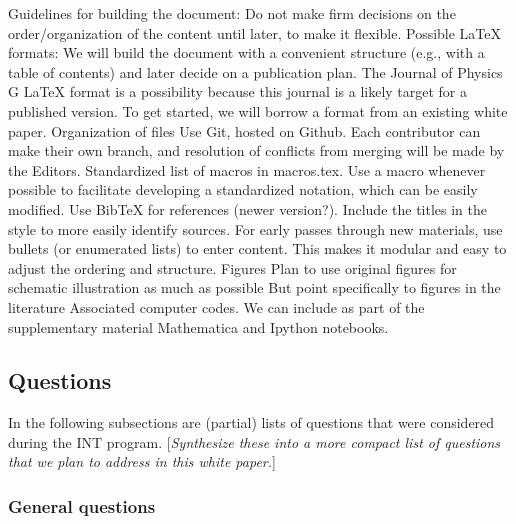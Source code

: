 Guidelines for building the document:
\bi
  \I Do not make firm decisions on the order/organization of the content until later,
      to make it flexible.
  \I Possible LaTeX formats:
     \bi
       \I We will build the document with a convenient structure (e.g., with
          a table of contents) and later decide on a publication plan.
       \I The Journal of Physics G LaTeX format is a possibility because this journal is a 
       likely target for a published version.
       \I To get started, we will borrow a format from an existing white paper. 
     \ei  
  \I Organization of files 
     \bi         
       \I Use Git, hosted on Github.  Each contributor can make their own branch, and
          resolution of conflicts from merging will be made by the Editors.
       \I Standardized list of macros in macros.tex.  Use a macro whenever possible to
          facilitate developing a standardized notation, which can be easily modified.
       \I Use BibTeX for references (newer version?).  Include the titles in the style
           to more easily identify sources.
       \I For early passes through new materials, use bullets (or enumerated lists) to enter content.    This makes it modular and easy to adjust the ordering and structure. 
     \ei  
  \I Figures
     \bi      
       \I Plan to use original figures for schematic illustration as much as possible
       \I But point specifically to figures in the literature  
     \ei  
  \I Associated computer codes.  We can include as part of the supplementary material 
      Mathematica and Ipython notebooks.
\ei


\subsection{Questions} \label{subsec:questions}

In the following subsections are (partial) lists of questions that were considered during the INT program.  [\emph{Synthesize these into a more compact list of questions that we plan to
address in this white paper.}]

\subsubsection{General questions}

